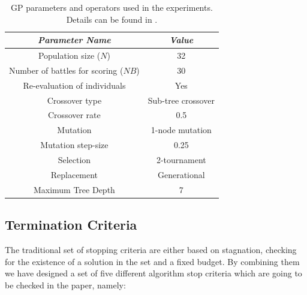 \documentclass[runningheads,a4paper]{llncs}
\begin{document}
\begin{table}
\begin{center}
\begin{tabular}{|c|c|}
\hline
{\em Parameter Name} & {\em Value} \\ \hline
Population size ($N$) & 32 \\ \hline
Number of battles for scoring ($NB$) & 30 \\ \hline 
Re-evaluation of individuals & Yes \\ \hline
Crossover type & Sub-tree crossover \\ \hline
Crossover rate & 0.5\\ \hline
Mutation  & 1-node mutation\\ \hline
Mutation step-size & 0.25 \\ \hline
Selection & 2-tournament \\ \hline
Replacement & Generational\\ \hline
Maximum Tree Depth &  7 \\ \hline
\end{tabular}
\caption{GP parameters and operators used in the experiments. Details can be found in \cite{EvoStar2014:GPBot:anon}.}
\label{tab:parameters}
\end{center}
\end{table}


\subsection{Termination Criteria}

The traditional set of stopping criteria are either based on stagnation, checking for the existence of a solution in the set and a fixed budget. By combining them we have designed a set of five different algorithm stop criteria which are going to be checked in the paper, namely:
\end{document}
